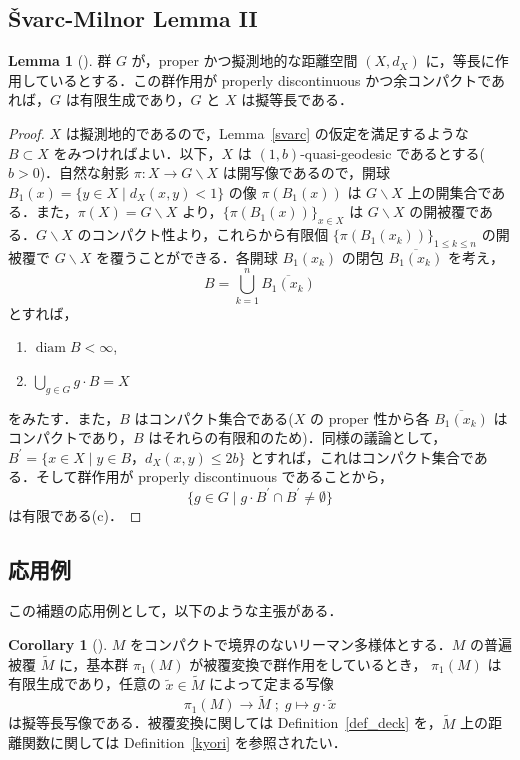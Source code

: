 \documentclass[dvipdfmx]{ujarticle}
\DeclareMathOperator{\diam}{diam}
\theoremstyle{definition}
\newtheorem{cor}[dfn]{Corollary}
\newtheorem{lem}[dfn]{Lemma}
\begin{document}
\subsection{Švarc-Milnor Lemma II}\label{subsec_svarc_top}
\begin{lem}[{\cite[Corollary 5.4.2]{1}}]
  群 $G$ が，proper かつ擬測地的な距離空間 $(X,d_X)$ に，等長に作用しているとする．この群作用が properly discontinuous かつ余コンパクトであれば，$G$ は有限生成であり，$G$ と $X$ は擬等長である．
\end{lem}
\begin{proof}
$X$ は擬測地的であるので，Lemma~\ref{svarc} の仮定を満足するような $B\subset X$ をみつければよい．以下，$X$ は $(1,b)$-quasi-geodesic であるとする($b>0$)．自然な射影 $\pi\colon X\rightarrow G\backslash X$ は開写像であるので，開球 $B_1(x)=\{y\in X\mid d_X(x,y)<1\}$ の像 $\pi(B_1(x))$ は $G\backslash X$ 上の開集合である．また，$\pi(X)=G\backslash X$ より，$\{\pi(B_1(x))\}_{x\in X}$ は $G\backslash X$ の開被覆である．$G\backslash X$ のコンパクト性より，これらから有限個 $\{\pi(B_1(x_k))\}_{1\leq k\leq n}$ の開被覆で $G\backslash X$ を覆うことができる．各開球 $B_1(x_k)$ の閉包 $\overline{B_1(x_k)}$ を考え，$$B=\bigcup_{k=1}^n\overline{B_1(x_k)}$$ とすれば，
\begin{enumerate}
  \item[(a)] $\diam B<\infty$,
  \item[(b)] $\bigcup_{g\in G}g\cdot B=X$
\end{enumerate}
\noindent
をみたす．また，$B$ はコンパクト集合である($X$ の proper 性から各 $\overline{B_1(x_k)}$ はコンパクトであり，$B$ はそれらの有限和のため)．同様の議論として，$B^\prime=\{x\in X\mid y\in B，d_X(x,y)\leq 2b\}$ とすれば，これはコンパクト集合である．そして群作用が properly discontinuous であることから，
 $$\{g\in G\mid g\cdot B^\prime\cap B^\prime\neq \emptyset\}$$
は有限である(c)．
\end{proof}

\subsection{応用例}
この補題の応用例として，以下のような主張がある．
\begin{cor}[{\cite[Corollary 5.4.10]{1}}]\label{cor}
  $M$ をコンパクトで境界のないリーマン多様体とする．$M$ の普遍被覆 $\widetilde{M}$ に，基本群 $\pi_1(M)$ が被覆変換で群作用をしているとき， $\pi_1(M)$ は有限生成であり，任意の $\tilde{x}\in\widetilde{M}$ によって定まる写像
  $$\pi_1(M)\rightarrow \widetilde{M}\; ;\; g\mapsto g\cdot \tilde{x}$$
  は擬等長写像である．被覆変換に関しては Definition~\ref{def_deck} を，$\widetilde{M}$ 上の距離関数に関しては Definition~\ref{kyori} を参照されたい．
\end{cor}
\end{document}
